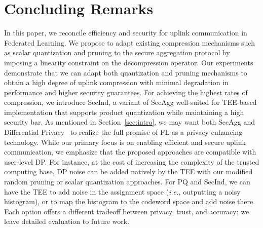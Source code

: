 \documentclass[11pt]{article}
\makeatletter
\newcommand{\SecInd}{{\sc SecInd}\xspace}
\newcommand{\SecAgg}{{\sc SecAgg}\xspace}
\def\ie{\textit{i.e.,}\@\xspace}
\newcommand{\modif}[1]{{\color{black}#1}}
\makeatother
\begin{document}
\section{Concluding Remarks}
\label{sec:discussion}
In this paper, we reconcile efficiency and security for uplink communication in Federated Learning.
We propose to adapt existing compression mechanisms such as scalar quantization and pruning to the secure aggregation protocol by imposing a linearity constraint on the decompression operator.
Our experiments demonstrate that we can adapt both quantization and pruning mechanisms to obtain a high degree of uplink compression with minimal degradation in performance and higher security guarantees. For achieving the highest rates of compression, we introduce \SecInd, a variant of \SecAgg well-suited for TEE-based implementation that supports product quantization while maintaining a high security bar.
As mentioned in Section~\ref{sec:intro}, we {may want } both \SecAgg and Differential Privacy~\cite{Graham-abadi2016deep} to realize the full promise of FL as a privacy-enhancing technology.
While our primary focus is on enabling efficient and secure uplink communication, we emphasize that the proposed approaches are compatible with user-level DP.
For instance, {at the cost of increasing the complexity of the trusted computing base}, DP noise can be added natively by the TEE with our modified random pruning or scalar quantization approaches.
For PQ  and \SecInd, {we can have the TEE to add noise in the assignment space (\ie outputting a noisy histogram), or to map the histogram to the codeword space and add noise there.
Each option offers a different tradeoff between privacy, trust, and accuracy; we leave detailed evaluation to future work.}





\end{document}
